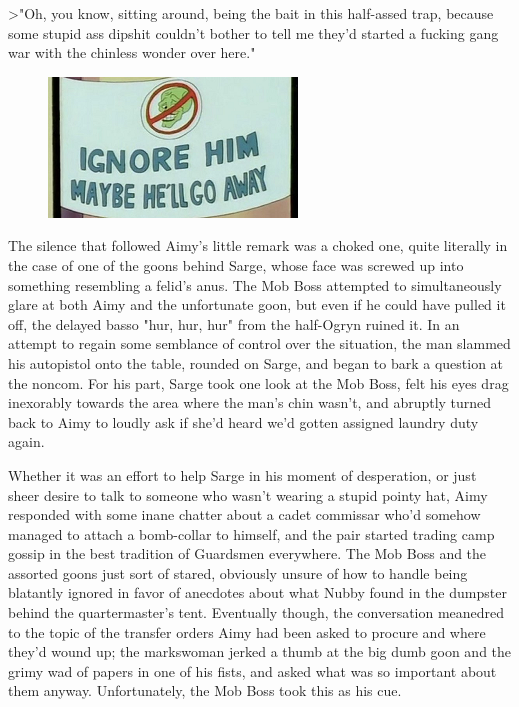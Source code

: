 >"Oh, you know, sitting around, being the bait in this half-assed trap, because some stupid ass dipshit couldn't bother to tell me they'd started a fucking gang war with the chinless wonder over here."

\begin{figure}
	\begin{center}
		\includegraphics[width=\figwidth]{pics/21/44.png}
	\end{center}
\end{figure}
The silence that followed Aimy's little remark was a choked one, quite literally in the case of one of the goons behind Sarge, whose face was screwed up into something resembling a felid's anus. 
The Mob Boss attempted to simultaneously glare at both Aimy and the unfortunate goon, but even if he could have pulled it off, the delayed basso "hur, hur, hur" from the half-Ogryn ruined it. 
In an attempt to regain some semblance of control over the situation, the man slammed his autopistol onto the table, rounded on Sarge, and began to bark a question at the noncom. 
For his part, Sarge took one look at the Mob Boss, felt his eyes drag inexorably towards the area where the man's chin wasn't, and abruptly turned back to Aimy to loudly ask if she'd heard we'd gotten assigned laundry duty again.

Whether it was an effort to help Sarge in his moment of desperation, or just sheer desire to talk to someone who wasn't wearing a stupid pointy hat, Aimy responded with some inane chatter about a cadet commissar who'd somehow managed to attach a bomb-collar to himself, and the pair started trading camp gossip in the best tradition of Guardsmen everywhere. 
The Mob Boss and the assorted goons just sort of stared, obviously unsure of how to handle being blatantly ignored in favor of anecdotes about what Nubby found in the dumpster behind the quartermaster's tent. 
Eventually though, the conversation meanedred to the topic of the transfer orders Aimy had been asked to procure and where they'd wound up; 
the markswoman jerked a thumb at the big dumb goon and the grimy wad of papers in one of his fists, and asked what was so important about them anyway. 
Unfortunately, the Mob Boss took this as his cue.

